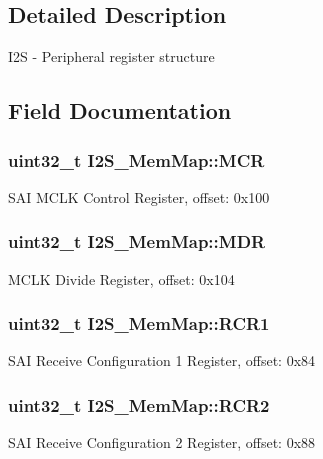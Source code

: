 \subsection{Detailed Description}
I2\+S -\/ Peripheral register structure 

\subsection{Field Documentation}
\hypertarget{struct_i2_s___mem_map_ae0d902ef484de4b08fb15ac3bb335cc4}{}
\subsubsection[{M\+C\+R}]{\setlength{\rightskip}{0pt plus 5cm}uint32\+\_\+t I2\+S\+\_\+\+Mem\+Map\+::\+M\+C\+R}\label{struct_i2_s___mem_map_ae0d902ef484de4b08fb15ac3bb335cc4}
S\+A\+I M\+C\+L\+K Control Register, offset\+: 0x100 \hypertarget{struct_i2_s___mem_map_a2c12ce85b2f95cc5f4f4cb594e1df7e0}{}
\subsubsection[{M\+D\+R}]{\setlength{\rightskip}{0pt plus 5cm}uint32\+\_\+t I2\+S\+\_\+\+Mem\+Map\+::\+M\+D\+R}\label{struct_i2_s___mem_map_a2c12ce85b2f95cc5f4f4cb594e1df7e0}
M\+C\+L\+K Divide Register, offset\+: 0x104 \hypertarget{struct_i2_s___mem_map_a260d1f4873f89a5072fce0812f479824}{}
\subsubsection[{R\+C\+R1}]{\setlength{\rightskip}{0pt plus 5cm}uint32\+\_\+t I2\+S\+\_\+\+Mem\+Map\+::\+R\+C\+R1}\label{struct_i2_s___mem_map_a260d1f4873f89a5072fce0812f479824}
S\+A\+I Receive Configuration 1 Register, offset\+: 0x84 \hypertarget{struct_i2_s___mem_map_a29720183f5d0741e5beeb4f68b1f3480}{}
\subsubsection[{R\+C\+R2}]{\setlength{\rightskip}{0pt plus 5cm}uint32\+\_\+t I2\+S\+\_\+\+Mem\+Map\+::\+R\+C\+R2}\label{struct_i2_s___mem_map_a29720183f5d0741e5beeb4f68b1f3480}
S\+A\+I Receive Configuration 2 Register, offset\+: 0x88 \hypertarget{struct_i2_s___mem_map_ae96e284d7e6ec36cb87d0431588c489d}{}
